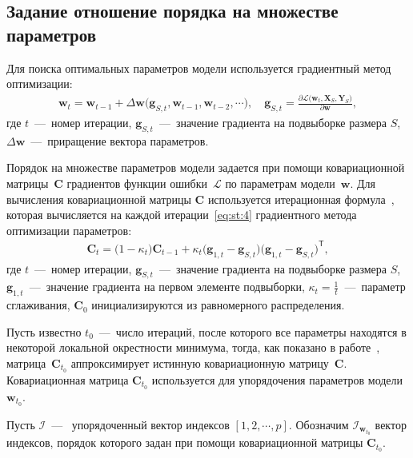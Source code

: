  \subsection{Задание отношение порядка на множестве параметров}
Для поиска оптимальных параметров модели используется градиентный метод оптимизации:
\begin{equation}
\label{eq:st:4}
\begin{aligned}
\textbf{w}_{t} = \textbf{w}_{t-1} + \Delta\textbf{w}\bigr(\textbf{g}_{S,t}, \textbf{w}_{t-1}, \textbf{w}_{t-2}, \cdots\bigr), \quad \textbf{g}_{S,t}=\frac{\partial \mathcal{L}\bigr(\textbf{w}_{t}, \textbf{X}_{S}, \textbf{Y}_{S}\bigr)}{\partial \textbf{w}},
\end{aligned}
\end{equation}
где $t$~---~номер итерации, $\textbf{g}_{S,t}$~---~значение градиента на подвыборке размера $S$, $\Delta\textbf{w}$~---~приращение вектора параметров.
 
 
Порядок на множестве параметров модели задается при помощи ковариационной матрицы~$\textbf{C}$ градиентов функции ошибки~$\mathcal{L}$ по параметрам модели~$\textbf{w}$. Для вычисления ковариационной матрицы $\textbf{C}$ используется итерационная формула~\cite{Chunyan2016}, которая вычисляется на каждой итерации~\eqref{eq:st:4} градиентного метода оптимизации параметров:
\begin{equation}
\label{eq:st:5}
\begin{aligned}
\textbf{C}_t = \bigr(1-\kappa_t\bigr)\textbf{C}_{t-1}+\kappa_t\bigr(\textbf{g}_{1,t}-\textbf{g}_{S,t}\bigr)\bigr(\textbf{g}_{1,t}-\textbf{g}_{S,t}\bigr)^{\mathsf{T}},
\end{aligned}
\end{equation}
 где $t$~---~номер итерации, $\textbf{g}_{S,t}$~---~значение градиента на подвыборке размера $S$, $\textbf{g}_{1,t}$~---~значение градиента на первом элементе подвыборки, $\kappa_t=\frac{1}{t}$~---~параметр сглаживания, $\textbf{C}_0$ инициализируются из равномерного распределения.
 
Пусть известно $t_0$~---~число итераций, после которого все параметры находятся в некоторой локальной окрестности минимума, тогда, как показано в работе~\cite{Chunyan2016}, матрица~$\textbf{C}_{t_0}$ аппроксимирует истинную ковариационную матрицу~$\textbf{C}$. Ковариационная матрица $\textbf{C}_{t_0}$ используется для упорядочения параметров модели $\textbf{w}_{t_0}$. 
 
Пусть $\mathcal{I}$~---~ упорядоченный вектор индексов $[1, 2, \cdots, p]$. Обозначим $\mathcal{I}_{\textbf{w}_{t_0}}$ вектор индексов, порядок которого задан при помощи ковариационной матрицы $\textbf{C}_{t_0}$. 
 
